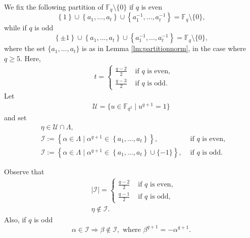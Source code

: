 \documentclass[11pt]{article}
\theoremstyle{definition}
\numberwithin{equation}{section}
\def\cI{\mathcal I}
\def\cU{\mathcal U}
\def\F{{\mathbb F}}
\begin{document}
We fix the following partition of $\F_q \setminus \{0\}$ if $q$ is even
\begin{equation} \label{eq:definitionaieven} \left\{ 1 \right\} \cup \left\{a_1, \dots, a_t \right\} \cup \left\{a_1^{-1}, \dots, a_t^{-1} \right\} = \F_{q} \setminus \{0\},
\end{equation}
while if $q$ is odd
\begin{equation} \label{eq:definitionaiodd} \left\{ \pm 1 \right\} \cup \left\{a_1, \dots, a_t \right\} \cup \left\{a_1^{-1}, \dots, a_t^{-1} \right\} = \F_{q} \setminus \{0\},
\end{equation}
where the set $\{a_1,\ldots,a_t\}$ is as in Lemma \ref{lm:partitionnorm}, in the case where $q \ge 5$. Here,
\begin{align*}
    & t = 
    \begin{cases}
        \frac{q-2}{2} & \mbox{ if } q \mbox{ is even}, \\
        \frac{q-3}{2} & \mbox{ if } q \mbox{ is odd}.
    \end{cases}
\end{align*}
Let 
\begin{align*}
\cU = \{u \in \F_{q^2} \mid u^{q+1} = 1\}
\end{align*}
and set 
\begin{align*}
    & \eta \in \cU \cap \Lambda, \\
    & \cI := \left\{\alpha \in \Lambda \mid \alpha^{q+1} \in \left\{a_1, \dots, a_t \right\} \right\}, & \mbox{ if } q \mbox{ is even, } \\
    & \cI := 
    \left\{\alpha \in \Lambda \mid \alpha^{q+1} \in \left\{a_1, \dots, a_t \right\} \cup \{-1\} \right\}, & \mbox{ if } q \mbox{ is odd. }
\end{align*}

Observe that 
\begin{align*}
    & |\cI| = \begin{cases}
    \frac{q-2}{2} & \mbox{ if } q \mbox{ is even}, \\
        \frac{q-1}{2} & \mbox{ if } q \mbox{ is odd}, 
    \end{cases} \\
    & \eta \not\in \cI. 
\end{align*}
Also, if $q$ is odd 
\begin{equation} \label{eq:oppositenonbelong}
    \alpha \in \cI \Rightarrow \beta \notin \cI, \mbox{ where }\beta^{q+1}=-\alpha^{q+1}.
\end{equation}
\end{document}
